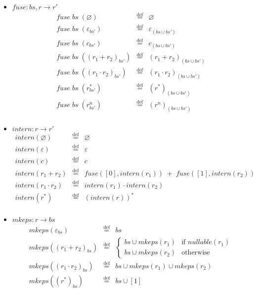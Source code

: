 \documentclass[12pt]{article}
\newcommand{\fuse}{\textit{fuse}}
\newcommand{\mkeps}{\textit{mkeps}}
\newcommand{\intern}{\textit{intern}}
\newcommand{\nullable}{\textit{nullable}}
\begin{document}
\begin{itemize}
\item $\fuse : bs, r \to r'$
  \[
  \begin{array}{rcl}
  \fuse\; bs\; (\varnothing)           & \stackrel{\text{def}}{=} & \varnothing \\
  \fuse\; bs\; (\varepsilon_{bs'})     & \stackrel{\text{def}}{=} & \varepsilon_{(bs \cup bs')} \\
  \fuse\; bs\; (c_{bs'})               & \stackrel{\text{def}}{=} & c_{(bs \cup bs')} \\
  \fuse\; bs\; ((r_1 + r_2)_{bs'})     & \stackrel{\text{def}}{=} & (r_1 + r_2)_{(bs \cup bs')} \\
  \fuse\; bs\; ((r_1 \cdot r_2)_{bs'}) & \stackrel{\text{def}}{=} & (r_1 \cdot r_2)_{(bs \cup bs')} \\
  \fuse\; bs\; (r^*_{bs'})             & \stackrel{\text{def}}{=} & (r^*)_{(bs \cup bs')} \\
  \fuse\; bs\; (r^n_{bs'})             & \stackrel{\text{def}}{=} & (r^n)_{(bs \cup bs')} \\
  \end{array}
  \]

\item $\intern : r \to r'$
  \[
  \begin{array}{rcl}
  \intern(\varnothing)   & \stackrel{\text{def}}{=} & \varnothing \\
  \intern(\varepsilon)   & \stackrel{\text{def}}{=} & \varepsilon \\
  \intern(c)             & \stackrel{\text{def}}{=} & c \\
  \intern(r_1 + r_2)     & \stackrel{\text{def}}{=} & \fuse([0], \intern(r_1)) \;+\; \fuse([1], \intern(r_2)) \\
  \intern(r_1 \cdot r_2) & \stackrel{\text{def}}{=} & \intern(r_1) \cdot \intern(r_2) \\
  \intern(r^*)           & \stackrel{\text{def}}{=} & (\intern(r))^* \\
  \end{array}
  \]

\item $\mkeps : r \to bs$
  \[
  \begin{array}{rcl}
  \mkeps(\varepsilon_{bs})       & \stackrel{\text{def}}{=} & bs \\
  \mkeps((r_1 + r_2)_{bs})       & \stackrel{\text{def}}{=} & 
       \begin{cases}
         bs \cup \mkeps(r_1) & \text{if }\nullable(r_1) \\
         bs \cup \mkeps(r_2) & \text{otherwise}
       \end{cases} \\
  \mkeps((r_1 \cdot r_2)_{bs})   & \stackrel{\text{def}}{=} & bs \cup \mkeps(r_1) \cup \mkeps(r_2) \\
  \mkeps((r^*)_{bs})             & \stackrel{\text{def}}{=} & bs \cup [1] \\
  \end{array}
  \]
\end{itemize}
\end{document}
